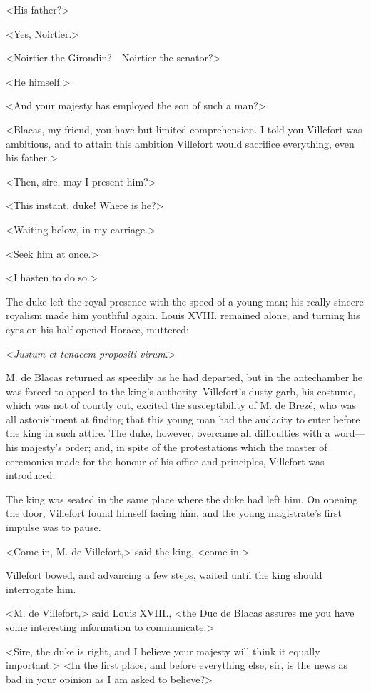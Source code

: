  <His father?> 

 <Yes, Noirtier.> 

 <Noirtier the Girondin?—Noirtier the senator?> 

 <He himself.> 

 <And your majesty has employed the son of such a man?> 

 <Blacas, my friend, you have but limited comprehension. I told you Villefort was ambitious, and to attain this ambition Villefort would sacrifice everything, even his father.> 

 <Then, sire, may I present him?> 

 <This instant, duke! Where is he?> 

 <Waiting below, in my carriage.> 

 <Seek him at once.> 

 <I hasten to do so.> 

 The duke left the royal presence with the speed of a young man; his really sincere royalism made him youthful again. Louis XVIII. remained alone, and turning his eyes on his half-opened Horace, muttered: 

 <\textit{Justum et tenacem propositi virum}.> 

 M. de Blacas returned as speedily as he had departed, but in the antechamber he was forced to appeal to the king's authority. Villefort's dusty garb, his costume, which was not of courtly cut, excited the susceptibility of M. de Brezé, who was all astonishment at finding that this young man had the audacity to enter before the king in such attire. The duke, however, overcame all difficulties with a word—his majesty's order; and, in spite of the protestations which the master of ceremonies made for the honour of his office and principles, Villefort was introduced. 

 The king was seated in the same place where the duke had left him. On opening the door, Villefort found himself facing him, and the young magistrate's first impulse was to pause. 

 <Come in, M. de Villefort,> said the king, <come in.> 

 Villefort bowed, and advancing a few steps, waited until the king should interrogate him. 

 <M. de Villefort,> said Louis XVIII., <the Duc de Blacas assures me you have some interesting information to communicate.> 

 <Sire, the duke is right, and I believe your majesty will think it equally important.>  <In the first place, and before everything else, sir, is the news as bad in your opinion as I am asked to believe?> 

